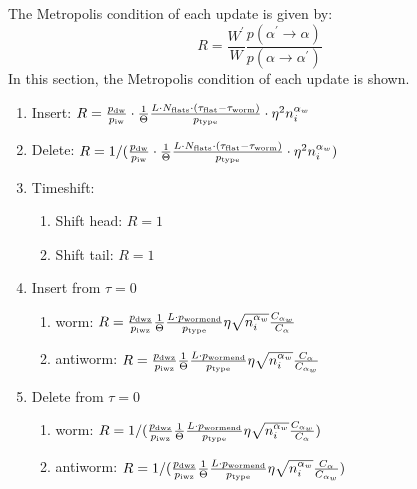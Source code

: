 \documentclass[12pt, two sided]{article}
\begin{document}
	The Metropolis condition of each update is given by:
	\begin{equation}
	R = \frac{W^\prime}{W} \frac{p(\alpha^\prime\to\alpha)}{p(\alpha\to\alpha^\prime)}
	\end{equation}
	In this section, the Metropolis condition of each update is shown.
	\begin{enumerate}
	\setcounter{enumi}{0}
		\item Insert: $R =  \frac{p_{\rm{dw}}}{p_{\rm{iw}}} \cdot \frac{1}{\Theta}  \frac{L \cdot N_{\rm{flats}} \cdot (\tau_{\rm{flat}}-\tau_{\rm{worm}})}{p_{\rm{type}}} \cdot \eta^2 n_i^{\alpha_w}$
		
		\item Delete: $R = 1/(\frac{p_{\rm{dw}}}{p_{\rm{iw}}} \cdot \frac{1}{\Theta}  \frac{L \cdot N_{\rm{flats}} \cdot (\tau_{\rm{flat}}-\tau_{\rm{worm}})}{p_{\rm{type}}} \cdot \eta^2 n_i^{\alpha_w} )$
		
		\item Timeshift: 		
		\begin{enumerate}
		\item{Shift head: $R =  1$}
		\item{Shift tail: $R = 1$}
		\end{enumerate}
		
		\item Insert from $\tau=0$
		\begin{enumerate}
		\item{worm: $R =  \frac{p_{\rm{dwz}}}{p_{\rm{iwz}}} \frac{1}{\Theta}  \frac{L \cdot p_{\rm{wormend}}}{p_{\rm{type}}} \eta \sqrt{n_i^{\alpha_w}} \frac{C_{\alpha_w}}{C_{\alpha}} $ }
		\item{antiworm: $R =  \frac{p_{\rm{dwz}}}{p_{\rm{iwz}}} \frac{1}{\Theta}  \frac{L \cdot p_{\rm{wormend}}}{p_{\rm{type}}} \eta \sqrt{n_i^{\alpha_w}} \frac{C_{\alpha}}{C_{\alpha_w}}$}
		\end{enumerate}
		
		\item Delete from $\tau=0$
		\begin{enumerate}
		\item{worm: $R =  1/(\frac{p_{\rm{dwz}}}{p_{\rm{iwz}}} \frac{1}{\Theta}  \frac{L \cdot p_{\rm{wormend}}}{p_{\rm{type}}} \eta \sqrt{n_i^{\alpha_w}} \frac{C_{\alpha_w}}{C_{\alpha}} ) $ }
		\item{antiworm: $R = 1/(\frac{p_{\rm{dwz}}}{p_{\rm{iwz}}} \frac{1}{\Theta}  \frac{L \cdot p_{\rm{wormend}}}{p_{\rm{type}}} \eta \sqrt{n_i^{\alpha_w}} \frac{C_{\alpha}}{C_{\alpha_w}})$}
		\end{enumerate}
		

\end{enumerate}
\end{document}
